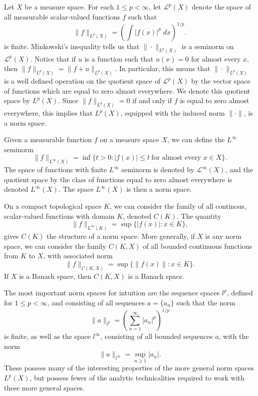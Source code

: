\begin{example}
    Let $X$ be a measure space. For each $1 \leq p < \infty$, let $\mathcal{L}^p(X)$ denote the space of all measurable scalar-valued functions $f$ such that
    \[ \| f \|_{L^p(X)} = \left( \int |f(x)|^p\; dx \right)^{1/p}. \]
    is finite. Minkowski's inequality tells us that $\| \cdot \|_{L^p(X)}$ is a seminorm on $\mathcal{L}^p(X)$. Notice that if $u$ is a function such that $u(x) = 0$ for almost every $x$, then $\| f \|_{L^p(X)} = \| f + u \|_{L^p(X)}$. In particular, this means that $\| \cdot \|_{L^p(X)}$ is a well defined operation on the quotient space of $\mathcal{L}^p(X)$ by the vector space of functions which are equal to zero almost everywhere. We denote this quotient space by $L^p(X)$. Since $\| f \|_{L^p(X)} = 0$ if and only if $f$ is equal to zero almost everywhere, this implies that $L^p(X)$, equipped with the induced norm $\| \cdot \|$, is a norm space.
\end{example}

\begin{example}
    Given a measurable function $f$ on a measure space $X$, we can define the $L^\infty$ seminorm
    \[ \| f \|_{L^\infty(X)} = \inf \{ t > 0: |f(x)| \leq t\ \text{for almost every $x \in X$} \}. \]
    The space of functions with finite $L^\infty$ seminorm is denoted by $\mathcal{L}^\infty(X)$, and the quotient space by the class of functions equal to zero almost everywhere is denoted $L^\infty(X)$. The space $L^\infty(X)$ is then a norm space.
\end{example}

\begin{example}
    On a compact topological space $K$, we can consider the family of all continous, scalar-valued functions with domain $K$, denoted $C(K)$. The quantity
    \[ \| f \|_{L^\infty(K)} = \sup \{ |f(x)|: x \in K \}, \]
    gives $C(K)$ the structure of a norm space. More generally, if $X$ is any norm space, we can consider the family $C(K,X)$ of all bounded continuous functions from $K$ to $X$, with associated norm
    \[ \| f \|_{C(K,X)} = \sup \{ \| f(x) \|: x \in K \}. \]
    If $X$ is a Banach space, then $C(K,X)$ is a Banach space.
\end{example}

\begin{example}
    The most important norm spaces for intuition are the sequence spaces $l^p$, defined for $1 \leq p < \infty$, and consisting of all sequences $a = \{ a_n \}$ such that the norm
    \[ \| a \|_{l^p} = \left( \sum_{n = 1}^\infty |a_n|^p \right)^{1/p} \]
    is finite, as well as the space $l^\infty$, consisting of all bounded sequences $a$, with the norm
    \[ \| a \|_{l^\infty} = \sup_{n \geq 1} |a_n|. \]
    These possess many of the interesting properties of the more general norm spaces $L^p(X)$, but possess fewer of the analytic technicalities required to work with these more general spaces.
\end{example}

